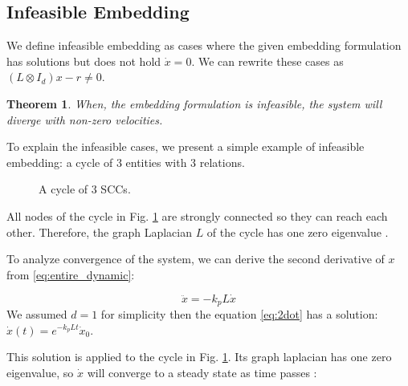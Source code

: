 \documentclass[letterpaper, 10 pt, conference]{ieeeconf}  %
\newtheorem{theorem}{Theorem}[section]
\begin{document}
\subsection{Infeasible Embedding}


We define infeasible embedding as cases where the given embedding formulation has solutions but does not hold \(\dot{x} = 0\). We can rewrite these cases as \((L \otimes I_d)x - r \neq 0\).


\begin{theorem}
    When, the embedding formulation is infeasible, the system will diverge with non-zero velocities. 
\end{theorem}

To explain the infeasible cases, we present a simple example of infeasible embedding: a cycle of 3 entities with 3 relations.

\begin{figure}[h]
\centering
{}
\caption{A cycle of 3 SCCs.}
\label{fig:cycle}
\end{figure}

All nodes of the cycle in Fig. \ref{fig:cycle} are strongly connected so they can reach each other. Therefore, the graph Laplacian \(L \) of the cycle has one zero eigenvalue \cite{olfati-saber_consensus_2007}.

To analyze convergence of the system, we can derive the second derivative of \(x\) from \eqref{eq:entire_dynamic}:

\begin{equation}\label{eq:2dot}
    \ddot{x} = -k_p L \dot{x}
\end{equation}
\noindent We assumed \(d = 1\) for simplicity then the equation \eqref{eq:2dot} has a solution: \( \dot{x}(t) = e^{-k_p Lt} \dot{x}_0 \). 

This solution is applied to the cycle in Fig. \ref{fig:cycle}. Its graph laplacian has one zero eigenvalue, so \(\dot{x}\) will converge to a steady state as time passes \cite{mirzaev_laplacian_2013}:
\end{document}
